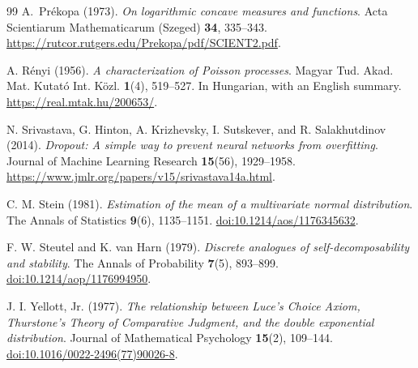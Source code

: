 \documentclass[11pt,letterpaper]{article}
\theoremstyle{remark}
\begin{document}
\begin{thebibliography}{99}
A.~Pr\'ekopa (1973).
\emph{On logarithmic concave measures and functions}.
Acta Scientiarum Mathematicarum (Szeged) \textbf{34}, 335--343.
\url{https://rutcor.rutgers.edu/Prekopa/pdf/SCIENT2.pdf}.

A. R\'enyi (1956).
\emph{A characterization of Poisson processes}.
Magyar Tud. Akad. Mat. Kutat\'o Int. K\"ozl. \textbf{1}(4), 519--527.
In Hungarian, with an English summary.
\url{https://real.mtak.hu/200653/}.

N. Srivastava, G. Hinton, A. Krizhevsky, I. Sutskever, and
R. Salakhutdinov (2014).
\emph{Dropout: A simple way to prevent neural networks from overfitting}.
Journal of Machine Learning Research \textbf{15}(56), 1929--1958.
\url{https://www.jmlr.org/papers/v15/srivastava14a.html}.

C. M. Stein (1981).
\emph{Estimation of the mean of a multivariate normal distribution}.
The Annals of Statistics \textbf{9}(6), 1135--1151.
\href{https://doi.org/10.1214/aos/1176345632}{doi:10.1214/aos/1176345632}.

F. W. Steutel and K. van Harn (1979).
\emph{Discrete analogues of self-decomposability and stability}.
The Annals of Probability \textbf{7}(5), 893--899.
\href{https://doi.org/10.1214/aop/1176994950}{doi:10.1214/aop/1176994950}.

J. I. Yellott, Jr. (1977).
\emph{The relationship between Luce's Choice Axiom, Thurstone's Theory
of Comparative Judgment, and the double exponential distribution}.
Journal of Mathematical Psychology \textbf{15}(2), 109--144.
\href{https://doi.org/10.1016/0022-2496(77)90026-8}{doi:10.1016/0022-2496(77)90026-8}.

\end{thebibliography}

\clearpage
\appendix
{}
\end{document}
